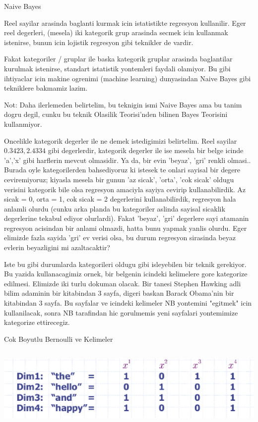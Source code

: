 \documentclass[12pt,fleqn]{article}\usepackage{../common}
\begin{document}
Naive Bayes

Reel sayilar arasinda baglanti kurmak icin istatistikte regresyon
kullanilir. Eger reel degerleri, (mesela) iki kategorik grup arasinda secmek
icin kullanmak istenirse, bunun icin lojistik regresyon gibi teknikler de
vardir.

Fakat kategoriler / gruplar ile baska kategorik gruplar arasinda
baglantilar kurulmak istenirse, standart istatistik yontemleri faydali
olamiyor. Bu gibi ihtiyaclar icin makine ogrenimi (machine learning)
dunyasindan Naive Bayes gibi tekniklere bakmamiz lazim.

Not: Daha ilerlemeden belirtelim, bu teknigin ismi Naive Bayes ama bu tanim
dogru degil, cunku bu teknik Olasilik Teorisi'nden bilinen Bayes Teorisini
kullanmiyor.

Oncelikle kategorik degerler ile ne demek istedigimizi belirtelim. Reel
sayilar $0.3423, 2.4334$ gibi degerlerdir, kategorik degerler ile ise
mesela bir belge icinde 'a','x' gibi harflerin mevcut olmasidir. Ya da, bir
evin 'beyaz', 'gri' renkli olmasi.. Burada oyle kategorilerden bahsediyoruz
ki istesek te onlari sayisal bir degere ceviremiyoruz; kiyasla mesela bir
gunun 'az sicak', 'orta', 'cok sicak' oldugu verisini kategorik bile olsa
regresyon amaciyla sayiya cevirip kullanabilirdik. Az sicak = 0, orta = 1,
cok sicak = 2 degerlerini kullanabilirdik, regresyon hala anlamli olurdu
(cunku arka planda bu kategoriler aslinda sayisal sicaklik degerlerine
tekabul ediyor olurlardi). Fakat 'beyaz', 'gri' degerlere sayi atamanin
regresyon acisindan bir anlami olmazdi, hatta bunu yapmak yanlis
olurdu. Eger elimizde fazla sayida 'gri' ev verisi olsa, bu durum regresyon
sirasinda beyaz evlerin beyazligini mi azaltacaktir?

Iste bu gibi durumlarda kategorileri oldugu gibi isleyebilen bir teknik
gerekiyor. Bu yazida kullanacagimiz ornek, bir belgenin icindeki kelimelere
gore kategorize edilmesi. Elimizde iki turlu dokuman olacak. Bir tanesi
Stephen Hawking adli bilim adaminin bir kitabindan 3 sayfa, digeri baskan
Barack Obama'nin bir kitabindan 3 sayfa. Bu sayfalar ve icindeki kelimeler
NB yontemini "egitmek" icin kullanilacak, sonra NB tarafindan hic
gorulmemis yeni sayfalari yontemimize kategorize ettirecegiz.

Cok Boyutlu Bernoulli ve Kelimeler

\includegraphics[height=4cm]{dims.png}
\end{document}
